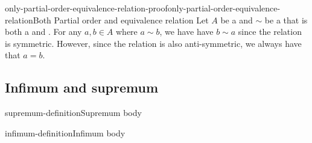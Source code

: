 \documentclass[preview]{standalone}
\begin{document}
\begin{snippetproof}{only-partial-order-equivalence-relation-proof}{only-partial-order-equivalence-relation}{Both Partial order and equivalence relation}
    Let \(A\) be a \set and \(\sim\) be a \binrelation that is both a \partialorder and \equivrelation.
    For any \(a,b\in A\) where \(a\sim b\), we have have \(b\sim a\) since the relation is symmetric.
    However, since the relation is also anti-symmetric, we always have that \(a=b\).
\end{snippetproof}

\subsection{Infimum and supremum}

\begin{snippetdefinition}{supremum-definition}{Supremum}
    body
\end{snippetdefinition}

\begin{snippetdefinition}{infimum-definition}{Infimum}
    body
\end{snippetdefinition}
\end{document}
